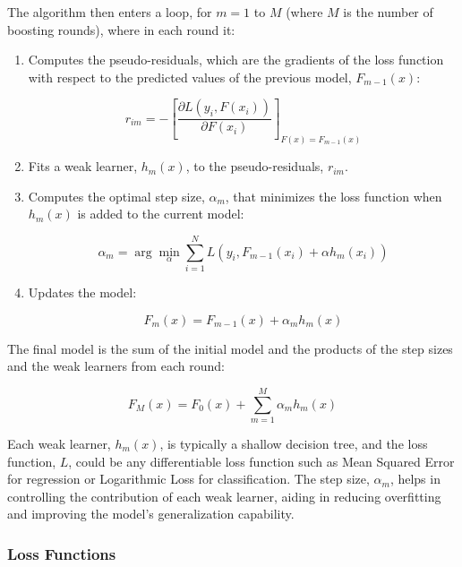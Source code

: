The algorithm then enters a loop, for \( m = 1 \) to \( M \) (where \( M \) is the number of boosting rounds), where in each round it:
\begin{enumerate}
    \item Computes the pseudo-residuals, which are the gradients of the loss function with respect to the predicted values of the previous model, \( F_{m-1}(x) \):

\begin{equation}
r_{im} = -\left[\frac{\partial L(y_i, F(x_i))}{\partial F(x_i)}\right]_{F(x)=F_{m-1}(x)}
\end{equation}

    \item Fits a weak learner, \( h_m(x) \), to the pseudo-residuals, \( r_{im} \).

    \item Computes the optimal step size, \( \alpha_m \), that minimizes the loss function when \( h_m(x) \) is added to the current model:

\begin{equation}
\alpha_m = \arg\min_{\alpha} \sum_{i=1}^N L(y_i, F_{m-1}(x_i) + \alpha h_m(x_i))
\end{equation}

    \item Updates the model:

\begin{equation}
F_m(x) = F_{m-1}(x) + \alpha_m h_m(x)
\end{equation}

\end{enumerate}

The final model is the sum of the initial model and the products of the step sizes and the weak learners from each round:

\begin{equation}
F_M(x) = F_0(x) + \sum_{m=1}^M \alpha_m h_m(x)
\end{equation}


Each weak learner, \( h_m(x) \), is typically a shallow decision tree, and the loss function, \( L \), could be any differentiable loss function such as Mean Squared Error for regression or Logarithmic Loss for classification. The step size, \( \alpha_m \), helps in controlling the contribution of each weak learner, aiding in reducing overfitting and improving the model's generalization capability.

\subsubsection{Loss Functions}

